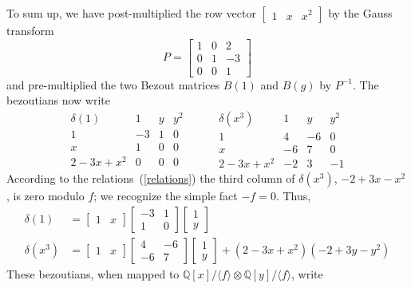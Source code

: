 \documentclass{standalone}
\begin{document}
To sum up, we have post-multiplied the row vector
$\begin{bmatrix}
	1 & x & x^2
\end{bmatrix}$ by the Gauss transform
$$P =
\begin{bmatrix}
	1 & 0 & 2 \\
	0 & 1 & -3 \\
	0 & 0 & 1
\end{bmatrix}$$
and pre-multiplied the two Bezout matrices $B(1)$ and $B(g)$ by $P^{-1}$. The bezoutians now write
$$
\begin{array}{c|ccc}
	\delta(1) & 1 & y & y^2\\
	\hline
	1 & -3 & 1 & 0\\
	x & 1 & 0 & 0\\
	2 - 3x + x^2 & 0 & 0 & 0
\end{array}
\hspace{1cm}
\begin{array}{c|ccc}
	\delta(x^3) & 1 & y & y^2\\
	\hline
	1 & 4 & -6 & 0 \\
	x & -6 & 7 & 0 \\
	2 - 3x + x^2 & -2 & 3 & -1
\end{array}
$$
According to the relations~(\ref{relations}) the third column of $\delta(x^3)$,  $-2 + 3x - x^2$, is zero modulo $f$; we recognize the simple fact $-f = 0$. Thus,
\begin{align} \nonumber %
\delta(1) &= \begin{bmatrix}
	1 & x
\end{bmatrix}
\begin{bmatrix}
	-3 & 1 \\
	1 & 0
\end{bmatrix} \nonumber %
\begin{bmatrix}
	1 \\
	y
\end{bmatrix}\\
\delta(x^3) &= \begin{bmatrix}
	1 & x
\end{bmatrix}
\begin{bmatrix}
	4 & -6 \\
	-6 & 7
\end{bmatrix} \nonumber %
\begin{bmatrix}
	1 \\
	y
\end{bmatrix} + (2 - 3x + x^2)(-2 + 3y - y^2)
\end{align}
These bezoutians, when mapped to $\mathbb{Q}[x]/\langle f \rangle \otimes \mathbb{Q}[y]/\langle f \rangle$, write
\end{document}
